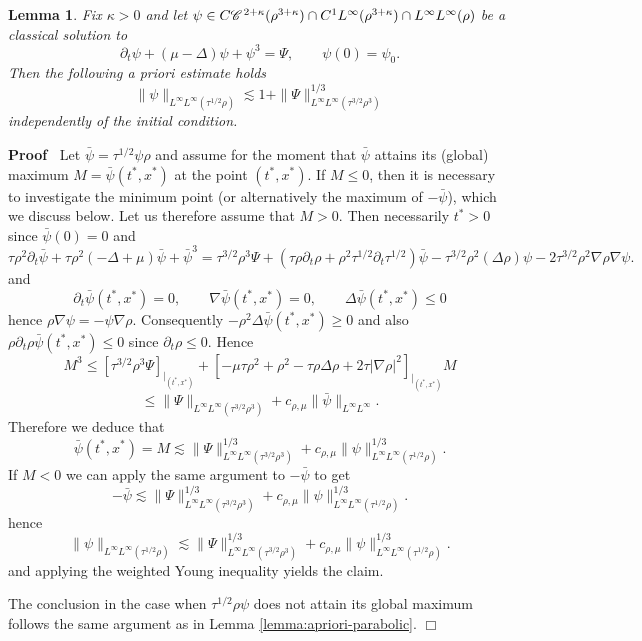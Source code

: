 \documentclass[a4paper,11pt]{article}
\renewcommand{\leq}{\leqslant}
\renewcommand{\geq}{\geqslant}
\newenvironment{proof}{\noindent\textbf{Proof\ }}{\hspace*{\fill}$\Box$\medskip}
\newtheorem{lemma}[theorem]{Lemma}
\numberwithin{equation}{section}
\newcommand{\CC}{\mathscr{C} \hspace{.1em}}
\newcommand{\8}{\infty}
\begin{document}
\begin{lemma}
  \label{lemma:weighted-coercive}
  Fix $\kappa > 0$ and let $\psi \in C\CC^{2 +
  \kappa} (\rho^{3 + \kappa}) \cap C^{1}L^{\infty} (\rho^{3+\kappa})\cap L^{\infty}L^{\infty}(\rho)$ be a classical solution
  to
  \[ \partial_t \psi + (\mu - \Delta) \psi + \psi^3 = \Psi, \qquad \psi (0) =
     \psi_0 . \]
  Then the following a priori estimate holds
  \[ \| \psi \|_{L^{\infty} L^{\infty} (\tau^{1 / 2} \rho)} \lesssim 1+ \|
     \Psi \|^{1 / 3}_{L^{\infty} L^{\infty} (\tau^{3 / 2} \rho^3)}  \]
     independently of the initial condition.
\end{lemma}

\begin{proof}
  Let $\bar{\psi} = \tau^{1 / 2} \psi \rho$ and assume for the moment that
  $\bar{\psi}$ attains its (global) maximum $M = \bar{\psi} (t^{\ast},
  x^{\ast})$ at the point $(t^{\ast}, x^{\ast})$. If $M \leq 0$, then it is
  necessary to investigate the minimum point (or alternatively the maximum of
  $- \bar{\psi}$), which we discuss below. Let us therefore assume that $M >
  0$. Then necessarily $t^{\ast} > 0$ since $\bar{\psi} (0) = 0$ and
  \[ \tau \rho^2 \partial_t  \bar{\psi} + \tau \rho^2 (- \Delta + \mu)
     \bar{\psi} + \bar{\psi}^3 = \tau^{3 / 2} \rho^3 \Psi + 
     (\tau \rho \partial_t \rho + \rho^2 \tau^{1 / 2} \partial_t \tau^{1 / 2})
     \bar{\psi} - \tau^{3 / 2} \rho^2  (\Delta \rho) \psi - 2 \tau^{3 / 2}
     \rho^2 \nabla \rho \nabla \psi . \]
  and
  \[ \partial_t  \bar{\psi} (t^{\ast}, x^{\ast}) = 0, \qquad \nabla \bar{\psi}
     (t^{\ast}, x^{\ast}) = 0, \qquad \Delta \bar{\psi} (t^{\ast}, x^{\ast})
     \leq 0 \]
  hence $\rho \nabla \psi = - \psi \nabla \rho$. Consequently $- \rho^2 \Delta
  \bar{\psi} (t^{\ast}, x^{\ast}) \geq 0$ and also $\rho \partial_t \rho
  \bar{\psi} (t^{\ast}, x^{\ast}) \leqslant 0$ since $\partial_t \rho
  \leqslant 0$. Hence
  \[ M^3 \leqslant [\tau^{3 / 2} \rho^3 \Psi ]_{|_{(t^{\ast}, x^{\ast})}} + [-\mu \tau\rho^2+\rho^2-\tau\rho\Delta\rho+2\tau |\nabla\rho|^{2}]_{|_{(t^{\ast}, x^{\ast})}} M \]
  \[ \leqslant \| \Psi \|_{L^{\infty} L^{\infty} (\tau^{3 / 2} \rho^3)} +
     c_{\rho, \mu} \| \bar{\psi} \|_{L^{\infty} L^{\infty}} . \]
  Therefore we deduce that
  \[ \bar{\psi} (t^{*},x^{*})= M \lesssim \| \Psi \|^{1 / 3}_{L^{\infty} L^{\infty}
     (\tau^{3 / 2} \rho^3)} + c_{\rho, \mu} \| \psi \|^{1 / 3}_{L^{\infty}
     L^{\infty} (\tau^{1 / 2} \rho)} . \]
  If $M < 0$ we can apply the same argument to $- \bar{\psi}$ to get
  \[ - \bar{\psi} \lesssim \| \Psi \|^{1 / 3}_{L^{\infty} L^{\infty} (\tau^{3
     / 2} \rho^3)} + c_{\rho, \mu} \| \psi \|^{1 / 3}_{L^{\infty} L^{\infty}
     (\tau^{1 / 2} \rho)} . \]
  hence
  \[ \| \psi \|_{L^{\infty} L^{\infty} (\tau^{1 / 2} \rho)} \lesssim \| \Psi
     \|^{1 / 3}_{L^{\infty} L^{\infty} (\tau^{3 / 2} \rho^3)} + c_{\rho, \mu}
     \| \psi \|^{1 / 3}_{L^{\infty} L^{\infty} (\tau^{1 / 2} \rho)} . \]
  and applying the weighted Young inequality yields the claim.


The conclusion in the case when $\tau^{1 / 2} \rho \psi$ does not
  attain its global maximum follows the same argument as in Lemma \ref{lemma:apriori-parabolic}.
\end{proof}
\end{document}

